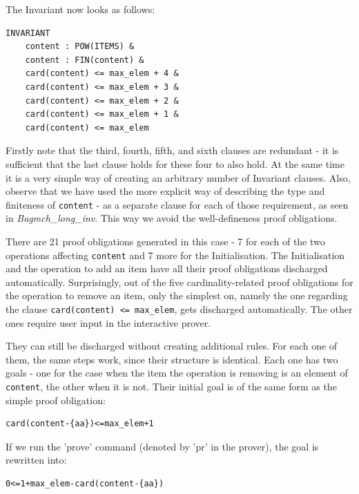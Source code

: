 \documentclass[12pt,journal,duplex]{IEEEtran}
\begin{document}
	The Invariant now looks as follows:
	\begin{lstlisting}
INVARIANT
	content : POW(ITEMS) &
	content : FIN(content) &
	card(content) <= max_elem + 4 &
	card(content) <= max_elem + 3 &
	card(content) <= max_elem + 2 &
	card(content) <= max_elem + 1 &
	card(content) <= max_elem
	\end{lstlisting}
	Firstly note that the third, fourth, fifth, and sixth clauses are redundant - it is sufficient that the last clause holds for these four to also hold. At the same time it is a very simple way of creating an arbitrary number of Invariant clauses. Also, observe that we have used the more explicit way of describing the type and finiteness of \texttt{content} - as a separate clause for each of those requirement, as seen in \emph{Bagmch\_long\_inv}. This way we avoid the well-defineness proof obligations.

	There are 21 proof obligations generated in this case - 7 for each of the two operations affecting \texttt{content} and 7 more for the Initialisation. The Initialisation and the operation to add an item have all their proof obligations discharged automatically. Surprisingly, out of the five cardinality-related proof obligations for the operation to remove an item, only the simplest on, namely the one regarding the clause \texttt{card(content) <= max\_elem}, gets discharged automatically. The other ones require user input in the interactive prover.

	They can still be discharged without creating additional rules. For each one of them, the same steps work, since their structure is identical. Each one has two goals - one for the case when the item the operation is removing is an element of \texttt{content}, the other when it is not. Their initial goal is of the same form as the simple proof obligation:
	\begin{lstlisting}
card(content-{aa})<=max_elem+1
	\end{lstlisting}
	If we run the 'prove' command (denoted by 'pr' in the prover), the goal is rewritten into:
	\begin{lstlisting}
0<=1+max_elem-card(content-{aa})
	\end{lstlisting}
\end{document}
